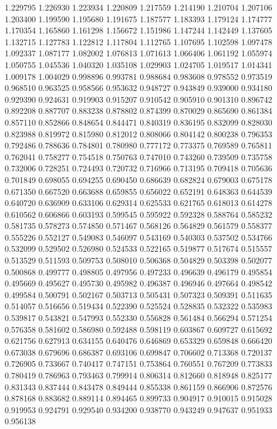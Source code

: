 1.229795
1.226930
1.223934
1.220809
1.217559
1.214190
1.210704
1.207106
1.203400
1.199590
1.195680
1.191675
1.187577
1.183393
1.179124
1.174777
1.170354
1.165860
1.161298
1.156672
1.151986
1.147244
1.142449
1.137605
1.132715
1.127783
1.122812
1.117804
1.112765
1.107695
1.102598
1.097478
1.092337
1.087177
1.082002
1.076813
1.071613
1.066406
1.061192
1.055974
1.050755
1.045536
1.040320
1.035108
1.029903
1.024705
1.019517
1.014341
1.009178
1.004029
0.998896
0.993781
0.988684
0.983608
0.978552
0.973519
0.968510
0.963525
0.958566
0.953632
0.948727
0.943849
0.939000
0.934180
0.929390
0.924631
0.919903
0.915207
0.910542
0.905910
0.901310
0.896742
0.892208
0.887707
0.883238
0.878802
0.874399
0.870029
0.865690
0.861384
0.857110
0.852866
0.848654
0.844471
0.840319
0.836195
0.832099
0.828030
0.823988
0.819972
0.815980
0.812012
0.808066
0.804142
0.800238
0.796353
0.792486
0.788636
0.784801
0.780980
0.777172
0.773375
0.769589
0.765811
0.762041
0.758277
0.754518
0.750763
0.747010
0.743260
0.739509
0.735758
0.732006
0.728251
0.724493
0.720732
0.716966
0.713195
0.709418
0.705636
0.701849
0.698055
0.694255
0.690450
0.686639
0.682824
0.679003
0.675178
0.671350
0.667520
0.663688
0.659855
0.656022
0.652191
0.648363
0.644539
0.640720
0.636909
0.633106
0.629314
0.625533
0.621765
0.618013
0.614278
0.610562
0.606866
0.603193
0.599545
0.595922
0.592328
0.588764
0.585232
0.581735
0.578273
0.574850
0.571467
0.568126
0.564829
0.561579
0.558377
0.555226
0.552127
0.549083
0.546097
0.543169
0.540303
0.537502
0.534766
0.532099
0.529502
0.526980
0.524533
0.522165
0.519877
0.517674
0.515557
0.513529
0.511593
0.509753
0.508010
0.506368
0.504829
0.503398
0.502077
0.500868
0.499777
0.498805
0.497956
0.497233
0.496639
0.496179
0.495854
0.495669
0.495627
0.495730
0.495982
0.496387
0.496946
0.497664
0.498542
0.499584
0.500791
0.502167
0.503713
0.505431
0.507323
0.509391
0.511635
0.514057
0.516656
0.519434
0.522390
0.525524
0.528835
0.532322
0.535983
0.539817
0.543821
0.547993
0.552330
0.556828
0.561484
0.566294
0.571254
0.576358
0.581602
0.586980
0.592488
0.598119
0.603867
0.609727
0.615692
0.621756
0.627913
0.634155
0.640476
0.646869
0.653329
0.659848
0.666420
0.673038
0.679696
0.686387
0.693106
0.699847
0.706602
0.713368
0.720137
0.726905
0.733667
0.740417
0.747151
0.753864
0.760551
0.767209
0.773833
0.780419
0.786963
0.793463
0.799914
0.806314
0.812660
0.818948
0.825177
0.831343
0.837444
0.843478
0.849444
0.855338
0.861159
0.866906
0.872576
0.878168
0.883682
0.889114
0.894465
0.899733
0.904917
0.910015
0.915028
0.919953
0.924791
0.929540
0.934200
0.938770
0.943249
0.947637
0.951933
0.956138
